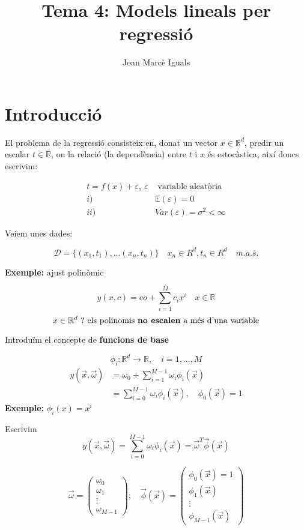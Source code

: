 \documentclass[a4paper]{article}
\title{Tema 4: Models lineals per regressió}
\author{Joan Marcè Iguals}
\begin{document}
\maketitle

\section{Introducció}
El problema de la regressió consisteix en, donat un vector $x \in \mathbb{R}^d$, predir un escalar $t \in \mathbb{R}$, on la relació (la dependència) entre $t$ i $x$ és estocàstica, així doncs escrivim:


\begin{align*}
t = f(x) + \varepsilon,\ \varepsilon &\text{ variable aleatòria} \\
i) \quad &\mathbb{E}(\varepsilon) = 0 \\
ii)\quad & Var(\varepsilon) = \sigma^2 < \infty
\end{align*}

Veiem unes dades:

$$
\mathcal{D} = \{ (x_1, t_1), ... (x_n, t_n)  \} \quad x_n \in R^d, t_n \in R^d \quad m.a.s.
$$

\textbf{Exemple:} ajust polinòmic

$$
y(x, c) = co + \sum_{i=1}^M c_i x^i \quad x \in \mathbb{R}
$$
$$
x \in \mathbb{R}^d\ ? \text{ els polinomis \textbf{no escalen} a més d'una variable}
$$

Introduïm el concepte de \textbf{funcions de base}

$$
\phi_i: \mathbb{R}^d \rightarrow \mathbb{R}, \quad i = 1,...,M
$$
\begin{align*}
y(\vec{x}, \vec{\omega}) &= \omega_0 + \sum_{i=1}^{M-1} \omega_i \phi_i (\vec{x}) \\
&=  \sum_{i=0}^{M-1} \omega_i \phi_i (\vec{x}), \quad \phi_0 (\vec{x}) = 1
\end{align*}
\textbf{Exemple:} $\phi_i (x) = x^i$

Escrivim
$$
y(\vec{x}, \vec{\omega}) = \sum_{i=0}^{M-1} \omega_i \phi_i (\vec{x}) = \vec{\omega}^T \vec{\phi} (\vec{x})
$$

$$
\vec{\omega} = 
\begin{pmatrix}
\omega_0 \\ \omega_1 \\ \vdots \\ \omega_{M-1}
\end{pmatrix};\quad
\vec{\phi}(\vec{x}) = 
\begin{pmatrix}
\phi_0 (\vec{x}) = 1 \\
\phi_1 (\vec{x}) \\
\vdots \\
\phi_{M-1} (\vec{x})
\end{pmatrix}
$$
\end{document}
